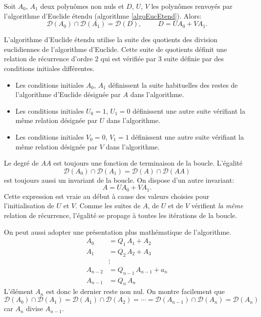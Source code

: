 \begin{prop}
 Soit $A_0$, $A_1$ deux polynômes non nuls et $D$, $U$, $V$ les polynômes renvoyés par l'algorithme d'Euclide étendu (algorithme \ref{algoEucEtend}). Alors:
\[
 \mathcal{D}(A_0)\cap \mathcal{D}(A_1) = \mathcal{D}(D), \hspace{1cm}
 D = UA_0 + VA_1.
\]
\end{prop}
\begin{demo}
 L'algorithme d'Euclide étendu utilise la suite des quotients des division euclidiennes de l'algorithme d'Euclide. Cette suite de quotients définit une relation de récurrence d'ordre $2$ qui est vérifiée par 3 suite définie par des conditions initiales différentes.
\begin{itemize}
 \item Les conditions initiales $A_0$, $A_1$ définissent la suite habituelles des restes de l'algorithme d'Euclide désignée par $A$ dans l'algorithme.
 \item Les conditions initiales $U_0=1$, $U_1=0$ définissent une autre suite vérifiant la même relation désignée par $U$ dans l'algorithme.
 \item Les conditions initiales $V_0=0$, $V_1=1$ définissent une autre suite vérifiant la même relation désignée par $V$ dans l'algorithme.
\end{itemize}
Le degré de $AA$ est toujours une fonction de terminaison de la boucle. L'égalité
\[
 \mathcal{D}(A_0)\cap \mathcal{D}(A_1) = \mathcal{D}(A)\cap \mathcal{D}(AA)
\]
est toujours aussi un invariant de la boucle. On dispose d'un autre invariant:
\[
 A = UA_0 + VA_1.
\]
Cette expression est vraie au début à cause des valeurs choisies pour l'initialisation de $U$ et $V$. Comme les suites de $A$, de $U$ et de $V$ vérifient \emph{la même} relation de récurrence, l'égalité se propage à toutes les itérations de la boucle.

On peut aussi adopter une présentation plus mathématique de l'algorithme.
\begin{align*}
 A_0 &= Q_1\,A_1 + A_2 \\
 A_1 &= Q_2\,A_2 + A_3 \\
   &\vdots \\
 A_{n-2} &= Q_{n-1}\,A_{n-1} +a_n\\
 A_{n-1} &= Q_n \, A_n
\end{align*}
L'élément $A_n$ est donc le dernier reste non nul. \newline
On montre facilement que 
\begin{displaymath}
 \mathcal D (A_0)\cap \mathcal D (A_1) = \mathcal D (A_1)\cap \mathcal D (A_2) = \cdots = \mathcal D (A_{n-1})\cap \mathcal D (A_n) = \mathcal D (A_n) 
\end{displaymath}
car $A_n$ divise $A_{n-1}$.


\end{demo}
